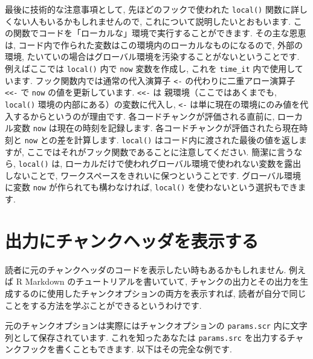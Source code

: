 \documentclass[
  11pt,
  lualatex,
  ja=standard]{bxjsreport}
\begin{document}
最後に技術的な注意事項として, 先ほどのフックで使われた \texttt{local()} 関数に詳しくない人もいるかもしれませんので, これについて説明したいとおもいます. この関数でコードを「ローカルな」環境で実行することができます. その主な恩恵は, コード内で作られた変数はこの環境内のローカルなものになるので, 外部の環境, たいていの場合はグローバル環境を汚染することがないということです. 例えばここでは \texttt{local()} 内で \texttt{now} 変数を作成し, これを \texttt{time\_it} 内で使用しています. フック関数内では通常の代入演算子 \texttt{\textless{}-} の代わりに二重アロー演算子 \texttt{\textless{}\textless{}-} で \texttt{now} の値を更新しています. \texttt{\textless{}\textless{}-} は 親環境（ここではあくまでも, \texttt{local()} 環境の内部にある）の変数に代入し, \texttt{\textless{}-} は単に現在の環境にのみ値を代入するからというのが理由です. 各コードチャンクが評価される直前に, ローカル変数 \texttt{now} は現在の時刻を記録します. 各コードチャンクが評価されたら現在時刻と \texttt{now} との差を計算します. \texttt{local()} はコード内に渡された最後の値を返しますが, ここではそれがフック関数であることに注意してください. 簡潔に言うなら, \texttt{local()} は, ローカルだけで使われグローバル環境で使われない変数を露出しないことで, ワークスペースをきれいに保つということです. グローバル環境に変数 \texttt{now} が作られても構わなければ, \texttt{local()} を使わないという選択もできます.

\hypertarget{show-header}{%
\section{出力にチャンクヘッダを表示する}\label{show-header}}

読者に元のチャンクヘッダのコードを表示したい時もあるかもしれません. 例えば R Markdown のチュートリアルを書いていて, チャンクの出力とその出力を生成するのに使用したチャンクオプションの両方を表示すれば, 読者が自分で同じことをする方法を学ぶことができるというわけです.

元のチャンクオプションは実際にはチャンクオプションの \texttt{params.scr} 内に文字列として保存されています. これを知ったあなたは \texttt{params.src} を出力するチャンクフックを書くこともできます. 以下はその完全な例です.
\end{document}
